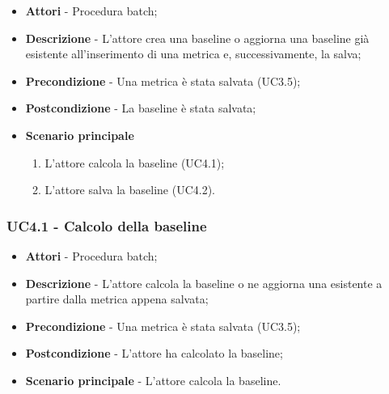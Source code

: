                 \begin{itemize}

                    \item \textbf{Attori} - Procedura batch;
                    \item \textbf{Descrizione} - L'attore crea una baseline o aggiorna una baseline già esistente all'inserimento
                    di una metrica e, successivamente, la salva;
                    \item \textbf{Precondizione} - Una metrica è stata salvata (UC3.5);
                    \item \textbf{Postcondizione} - La baseline è stata salvata;
                    \item \textbf{Scenario principale}

                        \begin{enumerate}

                            \item L'attore calcola la baseline (UC4.1);
                            \item L'attore salva la baseline (UC4.2).

                        \end{enumerate}

                \end{itemize}

                \subsubsection{UC4.1 - Calcolo della baseline}

                    \begin{itemize}

                        \item \textbf{Attori} - Procedura batch;
                        \item \textbf{Descrizione} - L'attore calcola la baseline o ne aggiorna una esistente a partire dalla
                        metrica appena salvata;
                        \item \textbf{Precondizione} - Una metrica è stata salvata (UC3.5);
                        \item \textbf{Postcondizione} - L'attore ha calcolato la baseline;
                        \item \textbf{Scenario principale} - L'attore calcola la baseline.

                    \end{itemize}

